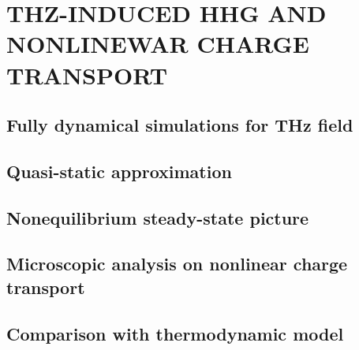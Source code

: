 \chapter{THZ-INDUCED HHG AND NONLINEWAR CHARGE TRANSPORT}
\section{Fully dynamical simulations for THz field}
\section{Quasi-static approximation}
\section{Nonequilibrium steady-state picture}
\section{Microscopic analysis on nonlinear charge transport}
\section{Comparison with thermodynamic model}